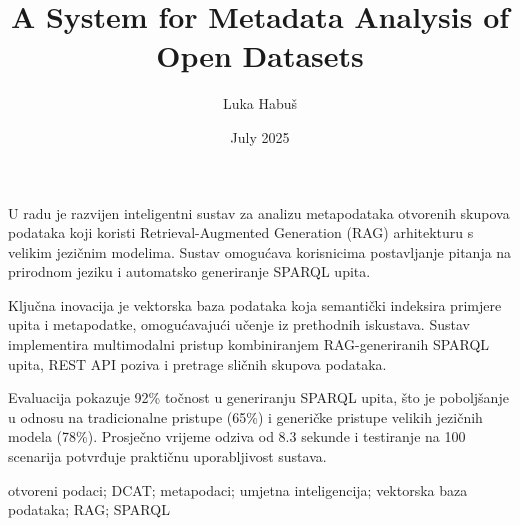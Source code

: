\documentclass[diplomskirad]{fer}
\title{A System for Metadata Analysis of Open Datasets}
\author{Luka Habuš}
\date{July 2025}
\begin{document}
\maketitle



\begin{zahvale}
\end{zahvale}

\mainmatter

\tableofcontents











\begin{sazetak}
U radu je razvijen inteligentni sustav za analizu metapodataka otvorenih skupova podataka koji koristi Retrieval-Augmented Generation (RAG) arhitekturu s velikim jezičnim modelima. Sustav omogućava korisnicima postavljanje pitanja na prirodnom jeziku i automatsko generiranje SPARQL upita.

Ključna inovacija je vektorska baza podataka koja semantički indeksira primjere upita i metapodatke, omogućavajući učenje iz prethodnih iskustava. Sustav implementira multimodalni pristup kombiniranjem RAG-generiranih SPARQL upita, REST API poziva i pretrage sličnih skupova podataka.

Evaluacija pokazuje 92\% točnost u generiranju SPARQL upita, što je poboljšanje u odnosu na tradicionalne pristupe (65\%) i generičke pristupe velikih jezičnih modela (78\%). Prosječno vrijeme odziva od 8.3 sekunde i testiranje na 100 scenarija potvrđuje praktičnu uporabljivost sustava.
\end{sazetak}

\begin{kljucnerijeci}
    otvoreni podaci; DCAT; metapodaci; umjetna inteligencija; vektorska baza podataka; RAG; SPARQL
\end{kljucnerijeci}
\end{document}

